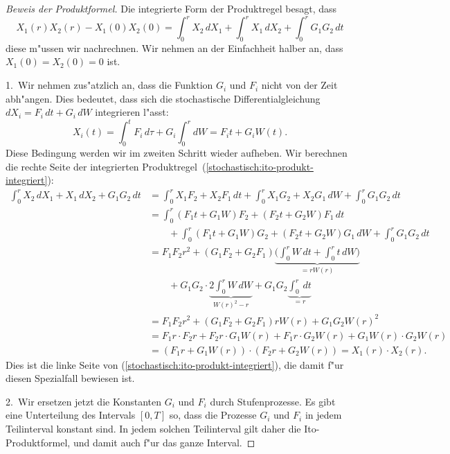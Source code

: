 \begin{proof}[Beweis der Produktformel]
Die integrierte Form der Produktregel besagt, dass 
\begin{equation}
X_1(r)X_2(r)-X_1(0)X_2(0)
=
\int_0^r X_2\,dX_1 + \int_0^r X_1\,dX_2 + \int_0^r G_1G_2\,dt
\label{stochastisch:ito-produkt-integriert}
\end{equation}
diese m"ussen wir nachrechnen.
Wir nehmen an der Einfachheit halber an, dass $X_1(0)=X_2(0)=0$ ist.

1.~Wir nehmen zus"atzlich an, dass die Funktion $G_i$ und $F_i$ nicht von
der Zeit abh"angen.
Dies bedeutet, dass sich die stochastische Differentialgleichung
$dX_i=F_i\,dt+G_i\,dW$ integrieren l"asst:
\[
X_i(t) = \int_0^t F_i\,d\tau + G_i\int_0^r dW =  F_it+G_iW(t).
\]
Diese Bedingung werden wir im zweiten Schritt wieder aufheben.
Wir berechnen die rechte Seite der integrierten
Produktregel~(\ref{stochastisch:ito-produkt-integriert}):
\begin{align*}
\int_0^r X_2\,dX_1 + X_1\,dX_2 + G_1G_2\,dt
&=
\int_0^rX_1F_2+X_2F_1\,dt + \int_0^r X_1G_2+X_2G_1\,dW + \int_0^r G_1G_2\,dt
\\
&=
\int_0^r(F_1t+G_1W)F_2+(F_2t+G_2W)F_1\,dt
\\
&\qquad
+ \int_0^r (F_1t+G_1W)G_2+(F_2t+G_2W)G_1\,dW + \int_0^r G_1G_2\,dt
\\
&=F_1F_2r^2+(G_1F_2+G_2F_1)\underbrace{\biggl(\int_0^rW\,dt + \int_0^rt\,dW\biggr)}_{\textstyle = rW(r)}
\\
&\qquad
+G_1G_2\cdot \underbrace{2\int_0^r W\,dW}_{\textstyle W(r)^2-r}
+ G_1G_2\underbrace{\int_0^r\,dt}_{\textstyle =r}
\\
&= 
F_1F_2r^2 + (G_1F_2+G_2F_1)rW(r) + G_1G_2W(r)^2
\\
&= 
F_1r\cdot F_2r + F_2r\cdot G_1W(r)+F_1r\cdot G_2W(r) + G_1W(r)\cdot G_2W(r)
\\
&= 
(F_1r + G_1W(r))\cdot(F_2r +  G_2W(r))
=
X_1(r) \cdot X_2(r).
\end{align*}
Dies ist die linke Seite von (\ref{stochastisch:ito-produkt-integriert}), die
damit f"ur diesen Spezialfall bewiesen ist.

2.~Wir ersetzen jetzt die Konstanten $G_i$ und $F_i$ durch Stufenprozesse.
Es gibt eine Unterteilung des Intervals $[0,T]$ so, dass die Prozesse $G_i$
und $F_i$ in jedem Teilinterval konstant sind.
In jedem solchen Teilinterval gilt daher die Ito-Produktformel, und damit
auch f"ur das ganze Interval.


\end{proof}
